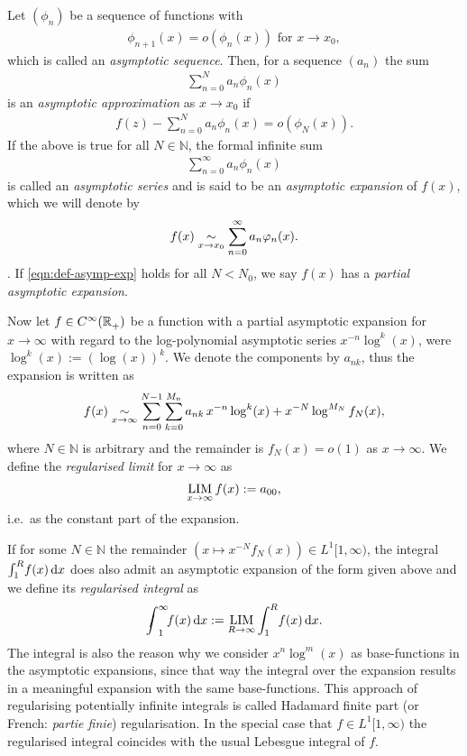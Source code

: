 \begin{Definition}
  Let $(\phi_n)$ be a sequence of functions with
\begin{align*}
  \phi_{n+1}(x) = o(\phi_n(x))\text{ for $x\to x_0$},
\end{align*}
  which is called an \emph{asymptotic sequence}. Then, for a sequence $(a_n)$
  the sum
  \begin{align*}
    \sum_{n=0}^N a_n\phi_n(x)
  \end{align*}
  is an \emph{asymptotic approximation} as $x\to x_0$ if
  \begin{align*}
    \label{eqn:def-asymp-exp}
    f(z) - \sum_{n=0}^N a_n\phi_n(x) = o(\phi_N(x)).
  \end{align*}
  If the above is true for all $N\in\mathbb{N}$, the formal infinite sum
  \begin{align*}
    \sum_{n=0}^\infty a_n\phi_n(x)
  \end{align*}
  is called an \emph{asymptotic series} and is said to be an \emph{asymptotic
  expansion} of $f(x)$, which we will denote by
  \begin{align*}
    f(x) \SimAs{x\to x_0} \sum_{n=0}^\infty a_n\phi_n(x).
  \end{align*}.
  If \eqref{eqn:def-asymp-exp} holds for all $N < N_0$, we say $f(x)$ has a
  \emph{partial asymptotic expansion}.
\end{Definition}
Now let $f\in\Cinf(\Rplus)$ be a function with a partial asymptotic expansion
for $x\to\infty$ with regard to the log-polynomial asymptotic series
$x^{-n}\log^k(x)$, were $\log^k(x) := (\log(x))^k$. We denote the components by
$a_{nk}$, thus the expansion is written as
\begin{align*}
  f(x) \SimAs{x\to\infty} \sum_{n=0}^{N-1}\sum_{k=0}^{M_n}
  a_{nk}\,x^{-n}\log^k(x) + x^{-N}\log^{M_N}f_N(x),
\end{align*}
where $N\in\mathbb{N}$ is arbitrary and the remainder is $f_N(x) = o(1)$ as
$x\to\infty$. We define the \emph{regularised limit} for $x\to\infty$ as
\begin{align}
  \Reglim_{x\to\infty} f(x) := a_{00},
\end{align}
i.e.\ as the constant part of the expansion.

If for some $N\in\mathbb{N}$ the remainder $(x\mapsto x^{-N}f_N(x))\in
L^1[1,\infty)$, the integral $\Integ[R]{1}{x}{f(x)}$ does also admit an
asymptotic expansion of the form given above and we define its \emph{regularised
integral} as
\begin{align}
  \Regint{x}{f(x)} := \Reglim_{R\to\infty}\Integ[R]{1}{x}{f(x)}.
\end{align}
The integral is also the reason why we consider $x^n \log^m(x)$ as
base-functions in the asymptotic expansions, since that way the integral over
the expansion results in a meaningful expansion with the same base-functions.
This approach of regularising potentially infinite integrals is called Hadamard
finite part (or French: \textit{partie finie}) regularisation. In the special
case that $f\in L^1[1,\infty)$ the regularised integral coincides with the usual
Lebesgue integral of $f$.

